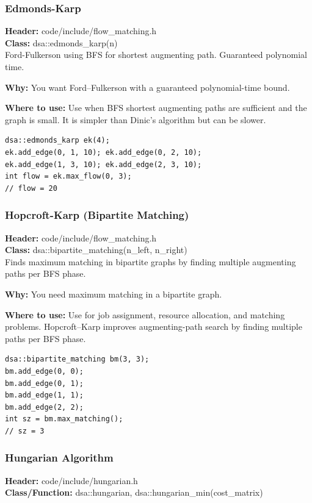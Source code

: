 \documentclass[11pt]{article}
\begin{document}
\subsubsection{Edmonds-Karp}
\textbf{Header:} code/include/flow\_matching.h\\
\textbf{Class:} dsa::edmonds\_karp(n)\\

Ford-Fulkerson using BFS for shortest augmenting path. Guaranteed polynomial time.

\textbf{Why:} You want Ford--Fulkerson with a guaranteed polynomial-time bound. \par \textbf{Where to use:} Use when BFS shortest augmenting paths are sufficient and the graph is small. It is simpler than Dinic's algorithm but can be slower.

\begin{lstlisting}
dsa::edmonds_karp ek(4);
ek.add_edge(0, 1, 10); ek.add_edge(0, 2, 10);
ek.add_edge(1, 3, 10); ek.add_edge(2, 3, 10);
int flow = ek.max_flow(0, 3);
// flow = 20
\end{lstlisting}

\subsubsection{Hopcroft-Karp (Bipartite Matching)}
\textbf{Header:} code/include/flow\_matching.h\\
\textbf{Class:} dsa::bipartite\_matching(n\_left, n\_right)\\

Finds maximum matching in bipartite graphs by finding multiple augmenting paths per BFS phase.

\textbf{Why:} You need maximum matching in a bipartite graph. \par \textbf{Where to use:} Use for job assignment, resource allocation, and matching problems. Hopcroft--Karp improves augmenting-path search by finding multiple paths per BFS phase.

\begin{lstlisting}
dsa::bipartite_matching bm(3, 3);
bm.add_edge(0, 0);
bm.add_edge(0, 1);
bm.add_edge(1, 1);
bm.add_edge(2, 2);
int sz = bm.max_matching();
// sz = 3
\end{lstlisting}

\subsubsection{Hungarian Algorithm}
\textbf{Header:} code/include/hungarian.h\\
\textbf{Class/Function:} dsa::hungarian, dsa::hungarian\_min(cost\_matrix)\\
\end{document}
